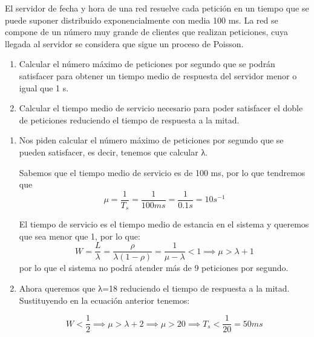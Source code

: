 \begin{problem}[9]
El servidor de fecha y hora de una red resuelve cada petición en un tiempo que se puede suponer distribuido exponencialmente con media 100 ms. La red se compone de un número muy grande de clientes que realizan peticiones, cuya llegada al servidor se considera que sigue un proceso de Poisson.
\begin{enumerate}
\item Calcular el número máximo de peticiones por segundo que se podrán satisfacer para obtener un tiempo medio de respuesta del servidor menor o igual que 1 s.
\item Calcular el tiempo medio de servicio necesario para poder satisfacer el doble de peticiones reduciendo el tiempo de respuesta a la mitad.

\end{enumerate}

\solution

\yoP


\begin{enumerate}
\item Nos piden calcular el número máximo de peticiones por segundo que se pueden satisfacer, es decir, tenemos que calcular λ.

Sabemos que el tiempo medio de servicio es de 100 ms, por lo que tendremos que
\[μ = \frac{1}{T_s}=\frac{1}{100 ms} = \frac{1}{0.1s}=10s^{-1}\]

El tiempo de servicio es el tiempo medio de estancia en el sistema y queremos que sea menor que 1, por lo que:
\[W=\frac{L}{λ}=\frac{\rho}{λ(1-\rho)}=\frac{1}{μ-λ} < 1 \implies μ > λ +1\]
por lo que el sistema no podrá atender más de 9 peticiones por segundo.

\item Ahora queremos que λ=18 reduciendo el tiempo de respuesta a la mitad. Sustituyendo en la ecuación anterior tenemos:

\[W < \frac{1}{2} \implies μ > λ +2 \implies μ > 20 \implies T_s < \frac{1}{20} = 50 ms\]
\end{enumerate}

\end{problem}


